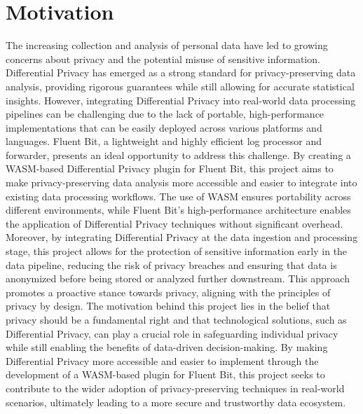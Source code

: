 \section{Motivation}
The increasing collection and analysis of personal data have led to growing concerns about privacy and the potential misuse of sensitive information. Differential Privacy has emerged as a strong standard for privacy-preserving data analysis, providing rigorous guarantees while still allowing for accurate statistical insights. However, integrating Differential Privacy into real-world data processing pipelines can be challenging due to the lack of portable, high-performance implementations that can be easily deployed across various platforms and languages.
Fluent Bit, a lightweight and highly efficient log processor and forwarder, presents an ideal opportunity to address this challenge. By creating a WASM-based Differential Privacy plugin for Fluent Bit, this project aims to make privacy-preserving data analysis more accessible and easier to integrate into existing data processing workflows. The use of WASM ensures portability across different environments, while Fluent Bit's high-performance architecture enables the application of Differential Privacy techniques without significant overhead.
Moreover, by integrating Differential Privacy at the data ingestion and processing stage, this project allows for the protection of sensitive information early in the data pipeline, reducing the risk of privacy breaches and ensuring that data is anonymized before being stored or analyzed further downstream. This approach promotes a proactive stance towards privacy, aligning with the principles of privacy by design.
The motivation behind this project lies in the belief that privacy should be a fundamental right and that technological solutions, such as Differential Privacy, can play a crucial role in safeguarding individual privacy while still enabling the benefits of data-driven decision-making. By making Differential Privacy more accessible and easier to implement through the development of a WASM-based plugin for Fluent Bit, this project seeks to contribute to the wider adoption of privacy-preserving techniques in real-world scenarios, ultimately leading to a more secure and trustworthy data ecosystem.